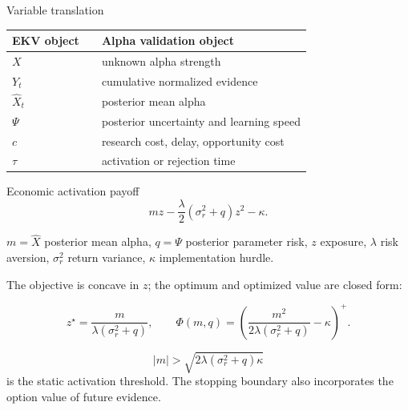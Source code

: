 \documentclass[aspectratio=169,10pt]{beamer}
\newcommand{\wh}{\widehat}
\newcommand{\1}{\mathbf{1}}
\begin{document}
\begin{frame}{Variable translation}
  \large
  \begin{center}
  \begin{tabular}{lll}
    \toprule
    EKV object & & Alpha validation object \\
    \midrule
    \(X\) & & unknown alpha strength \\
    \(Y_t\) & & cumulative normalized evidence \\
    \(\wh X_t\) & & posterior mean alpha \\
    \(\Psi\) & & posterior uncertainty and learning speed \\
    \(c\) & & research cost, delay, opportunity cost \\
    \(\tau\) & & activation or rejection time \\
    \bottomrule
  \end{tabular}
  \end{center}
\end{frame}

\begin{frame}{Economic activation payoff}
  \Large
  \[
    mz-\frac{\lambda}{2}(\sigma_r^2+q)z^2-\kappa .
  \]

  \vspace{0.5em}
  \footnotesize
  \(m=\wh X\) posterior mean alpha, \(q=\Psi\) posterior parameter risk, \(z\) exposure,
  \(\lambda\) risk aversion, \(\sigma_r^2\) return variance, \(\kappa\) implementation hurdle.
  \normalsize

  \pause
  \vspace{0.3em}
  The objective is concave in \(z\); the optimum and optimized value are closed form:

  \vspace{0.3em}
  \Large
  \[
    z^\star=\frac{m}{\lambda(\sigma_r^2+q)},
    \qquad
    \Phi(m,q)
    =
    \left(
      \frac{m^2}{2\lambda(\sigma_r^2+q)}
      -\kappa
    \right)^+ .
  \]

  \pause
  \vspace{0.4em}
  \normalsize
  \[
    |m|>\sqrt{2\lambda(\sigma_r^2+q)\kappa}
  \]
  is the static activation threshold. The stopping boundary also incorporates the option
  value of future evidence.
\end{frame}
\end{document}
